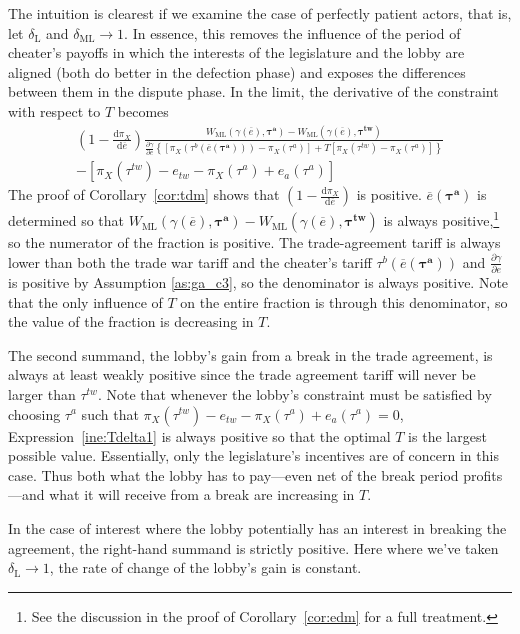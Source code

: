 \documentclass[authoryear, review]{elsarticle}
\newcommand{\ov}{\overline}
\newcommand{\bta}{\bm{\tau^a}}
\newcommand{\ga}{\gamma}
\newcommand{\btw}{\bm{\tau^{tw}}}
\newcommand{\de}{\delta}
\begin{document}
The intuition is clearest if we examine the case of perfectly patient actors, that is, let $\de_\text{L}$ and $\de_\text{ML} \rightarrow 1$. In essence, this removes the influence of the period of cheater's payoffs in which the interests of the legislature and the lobby are aligned (both do better in the defection phase) and exposes the differences between them in the dispute phase. In the limit, the derivative of the constraint with respect to $T$ becomes
\begin{multline}
  \left(1 - \frac{\mathrm{d} \pi_X}{\mathrm{d} \ov{e}} \right) \frac{ W_\text{ML}(\ga(\ov{e}),\bta) - W_\text{ML}(\ga(\ov{e}),\btw) }{\frac{\partial \ga}{\partial e} \left\{
  \left[ \pi_X(\tau^b(\ov{e}(\bta))) - \pi_X(\tau^a) \right] + T \left[ \pi_X(\tau^{tw}) - \pi_X(\tau^a) \right]\right\}} \\ - \left[ \pi_X(\tau^{tw}) - e_{tw} -\pi_X(\tau^a) + e_a(\tau^a) \right]
 	\label{ine:Tdelta1}
\end{multline}
The proof of Corollary~\ref{cor:tdm} shows that $\left(1 - \frac{\mathrm{d} \pi_X}{\mathrm{d} \ov{e}} \right)$ is positive. $\ov{e}(\bta)$ is determined so that $W_\text{ML}(\ga(\ov{e}),\bta) - W_\text{ML}(\ga(\ov{e}),\btw)$ is always positive,\footnote{See the discussion in the proof of Corollary~\ref{cor:edm} for a full treatment.} so the numerator of the fraction is positive. The trade-agreement tariff is always lower than both the trade war tariff and the cheater's tariff $\tau^b\left(\ov{e}(\bta)\right)$ and $\frac{\partial \ga}{\partial e}$ is positive by Assumption \ref{as:ga_c3}, so the denominator is always positive. Note that the only influence of $T$ on the entire fraction is through this denominator, so the value of the fraction is decreasing in $T$.

The second summand, the lobby's gain from a break in the trade agreement, is always at least weakly positive since the trade agreement tariff will never be larger than $\tau^{tw}$. Note that whenever the lobby's constraint must be satisfied by choosing $\tau^a$ such that $\pi_X(\tau^{tw}) - e_{tw} -\pi_X(\tau^a) + e_a(\tau^a) =0$, Expression~\ref{ine:Tdelta1} is always positive so that the optimal $T$ is the largest possible value. Essentially, only the legislature's incentives are of concern in this case. Thus both what the lobby has to pay---even net of the break period profits---and what it will receive from a break are increasing in $T$.

In the case of interest where the lobby potentially has an interest in breaking the agreement, the right-hand summand is strictly positive. Here where we've taken $\de_\text{L} \rightarrow 1$, the rate of change of the lobby's gain is constant.
\end{document}
